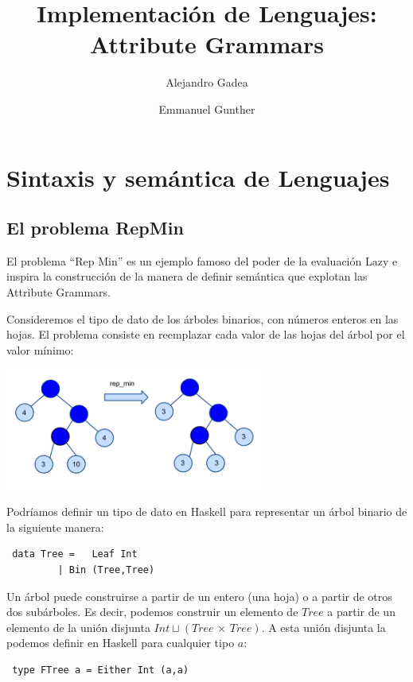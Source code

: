 \documentclass[a4paper,10pt]{article}
\title{Implementación de Lenguajes: Attribute Grammars}
\author{Alejandro Gadea \and Emmanuel Gunther}
\begin{document}
\maketitle
{}

\section{Sintaxis y semántica de Lenguajes}

\subsection{El problema RepMin}

El problema ``Rep Min'' es un ejemplo famoso del poder de la evaluación Lazy e inspira la construcción
de la manera de definir semántica que explotan las Attribute Grammars.

Consideremos el tipo de dato de los árboles binarios, con números enteros en las hojas. El problema
consiste en reemplazar cada valor de las hojas del árbol por el valor mínimo:

\begin{center}
 \includegraphics[height=4cm]{./repmin.png}
\end{center}

Podríamos definir un tipo de dato en Haskell para representar un árbol binario
de la siguiente manera:

\begin{lstlisting}
 data Tree =   Leaf Int 
	     | Bin (Tree,Tree)
\end{lstlisting}

Un árbol puede construirse a partir de un entero (una hoja) o a partir de otros
dos subárboles. Es decir, podemos construir un elemento de $Tree$ a partir
de un elemento de la unión disjunta $Int \sqcup (Tree\,\times\,Tree)$.
A esta unión disjunta la podemos definir en Haskell para cualquier tipo $a$:

\begin{lstlisting}
 type FTree a = Either Int (a,a)
\end{lstlisting}
\end{document}
